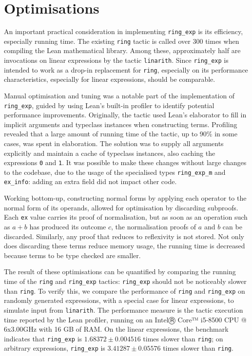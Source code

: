 \documentclass{llncs}
\newcommand{\lean}[1]{\texttt{#1}\xspace} %
\newcommand{\ring}{\lean{ring}}
\newcommand{\ringexp}{\lean{ring\_exp}}
\begin{document}

\section{Optimisations}

An important practical consideration in implementing \ringexp is its efficiency, especially running time.
The existing \lean{ring} tactic is called over 300 times when compiling the Lean mathematical library.
Among these, approximately half are invocations on linear expressions by the tactic \lean{linarith}.
Since \ringexp is intended to work as a drop-in replacement for \lean{ring},
especially on its performance characteristics, especially for linear expressions, should be comparable.

Manual optimisation and tuning was a notable part of the implementation of \ringexp,
guided by using Lean's built-in profiler to identify potential performance improvements.
Originally, the tactic used Lean's elaborator to fill in implicit arguments and typeclass instances when constructing terms.
Profiling revealed that a large amount of running time of the tactic, up to 90\% in some cases,
was spent in elaboration.
The solution was to supply all arguments explicitly and maintain a cache of typeclass instances,
also caching the expressions \lean{0} and \lean{1}.
It was possible to make these changes without large changes to the codebase,
due to the usage of the specialised types \lean{ring\_exp\_m} and \lean{ex\_info}:
adding an extra field did not impact other code.

Working bottom-up, constructing normal forms by applying each operator to the normal form of its operands,
allowed for optimisation by discarding subproofs.
Each \lean{ex} value carries its proof of normalisation,
but as soon as an operation such as $a + b$ has produced its outcome $c$,
the normalisation proofs of $a$ and $b$ can be discarded.
Similarly, any proof that reduces to reflexivity is not stored.
Not only does discarding these terms reduce memory usage,
the running time is decreased because terms to be type checked are smaller.


The result of these optimisations can be quantified by comparing the running time
of the \lean{ring} and \ringexp tactics: \ringexp should not be noticeably slower than \lean{ring}.
To verify this, we compare the performance of \lean{ring} and \ringexp on randomly generated expressions,
with a special case for linear expressions, to simulate input from \lean{linarith}.
The performance measure is the tactic execution time reported by the Lean profiler,
running on an IntelⓇ Core™ i5-8500 CPU @ 6x3.00GHz with 16 GB of RAM.
On the linear expressions, the benchmark indicates that \ringexp is $1.68372 \pm 0.004516$ times slower than \ring;
on arbitrary expressions, \ringexp is $3.41287 \pm 0.05576$ times slower than \ring.
\end{document}
